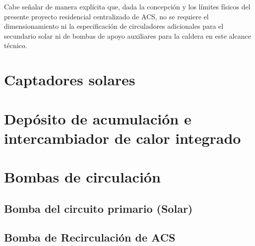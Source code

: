 \documentclass[12pt]{article}
\begin{document}
Cabe señalar de manera explícita que, dada la concepción y los límites físicos del presente proyecto residencial centralizado de ACS, no se requiere el dimensionamiento ni la especificación de circuladores adicionales para el secundario solar ni de bombas de apoyo auxiliares para la caldera en este alcance técnico.


\renewcommand{\refname}{Bibliografía}

\cleardoublepage
{}
{}


\clearpage



\begin{appendixspecialsections}
	\section{Captadores solares}

		



	\section{Depósito de acumulación e intercambiador de calor integrado}

		

	\section{Bombas de circulación}

		\subsection{Bomba del circuito primario (Solar)}
		

		\subsection{Bomba de Recirculación de ACS}
		

\end{appendixspecialsections}


\label{anx:01-planos}







\end{document}
